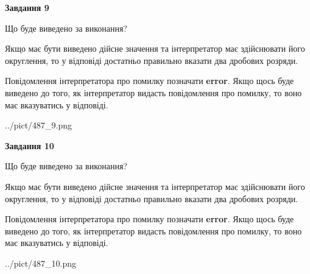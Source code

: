 \documentclass[12pt, ukrainian]{article}
\begin{document}
{\begin {Large}
{\begin {center}\textbf{Завдання 9}\end {center}}\par
Що буде виведено за виконання? \par

Якщо має бути виведено дійсне значення та інтерпретатор має здійснювати його округлення, 
то у відповіді достатньо правильно вказати два дробових розряди.

Повідомлення інтерпретатора про помилку позначати \textbf{error}.
Якщо щось буде виведено до того, як інтерпретатор видасть повідомлення про помилку, 
то воно має вказуватись у відповіді. \par

\begin{center}
	{../pict/487_9.png}
\end{center}
\newpage

{\begin {center}\textbf{Завдання 10}\end {center}}\par
Що буде виведено за виконання? \par

Якщо має бути виведено дійсне значення та інтерпретатор має здійснювати його округлення, 
то у відповіді достатньо правильно вказати два дробових розряди.

Повідомлення інтерпретатора про помилку позначати \textbf{error}.
Якщо щось буде виведено до того, як інтерпретатор видасть повідомлення про помилку, 
то воно має вказуватись у відповіді. \par

\begin{center}
	{../pict/487_10.png}
\end{center}
\newpage

\end {Large}}
\end{document}
